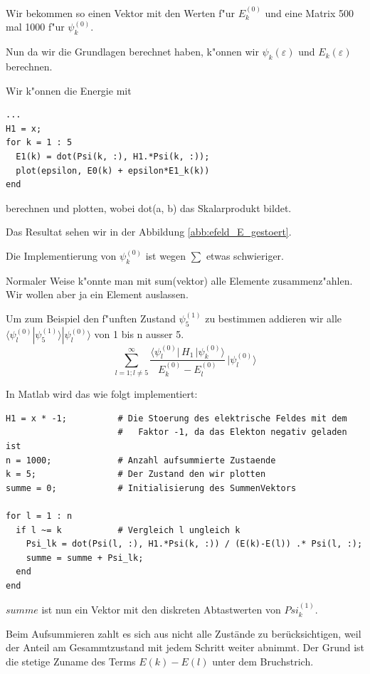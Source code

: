 \begin{refsection}
Wir bekommen so einen Vektor mit den Werten f"ur $E_k^{(0)}$
und eine Matrix 500 mal 1000 f"ur $\psi_k^{(0)}$.

Nun da wir die Grundlagen berechnet haben, k"onnen wir $\psi_k(\varepsilon)$ und $E_k(\varepsilon)$ berechnen.

Wir k"onnen die Energie mit
\begin{lstlisting}[style=Matlab]
...
H1 = x;
for k = 1 : 5
  E1(k) = dot(Psi(k, :), H1.*Psi(k, :));
  plot(epsilon, E0(k) + epsilon*E1_k(k))
end
\end{lstlisting}
berechnen und plotten, wobei dot(a, b) das Skalarprodukt bildet.

Das Resultat sehen wir in der Abbildung \ref{abb:efeld_E_gestoert}.

Die Implementierung von $\psi_k^{(0)}$ ist wegen $\sum$ etwas schwieriger.

Normaler Weise k"onnte man mit sum(vektor) alle Elemente zusammenz"ahlen.
Wir wollen aber ja ein Element auslassen.

Um zum Beispiel den f"unften Zustand $\psi_5^{(1)}$ zu bestimmen addieren wir alle 
$\langle\psi_l^{(0)}|\psi_5^{(1)}\rangle|\psi_l^{(0)}\rangle$
 von 1 bis n ausser 5.
\begin{equation}
  \sum_{l=1 ; l\ne 5}^{\infty}
    \frac{\langle \psi_l^{(0)}|\, H_1 \,|\psi_k^{(0)}\rangle}{E_k^{(0)}-E_l^{(0)}}
        \,
    |\psi_l^{(0)}\rangle
\end{equation}

In Matlab wird das wie folgt implementiert:
\begin{lstlisting}[style=Matlab]
H1 = x * -1;          # Die Stoerung des elektrische Feldes mit dem
                      #   Faktor -1, da das Elekton negativ geladen ist
n = 1000;             # Anzahl aufsummierte Zustaende
k = 5;                # Der Zustand den wir plotten
summe = 0;            # Initialisierung des SummenVektors

for l = 1 : n
  if l ~= k           # Vergleich l ungleich k
    Psi_lk = dot(Psi(l, :), H1.*Psi(k, :)) / (E(k)-E(l)) .* Psi(l, :);
    summe = summe + Psi_lk;
  end
end
\end{lstlisting}
$summe$ ist nun ein Vektor mit den diskreten Abtastwerten von $Psi_k^(1)$.

Beim Aufsummieren zahlt es sich aus nicht alle Zust\"ande zu ber\"ucksichtigen, weil der Anteil am Gesammtzustand 
mit jedem Schritt weiter abnimmt. Der Grund ist die stetige Zuname des Terms $E(k)-E(l)$ unter dem Bruchstrich.


\end{refsection}
